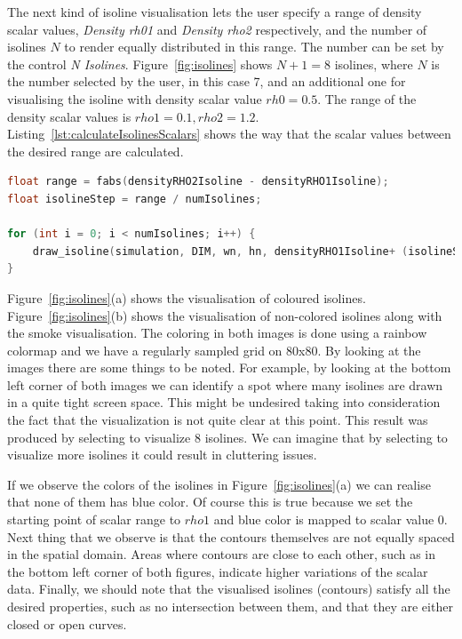 The next kind of isoline visualisation lets the user specify a range of density scalar values, \emph{Density rh01} and \emph{Density rho2} respectively, and the number of isolines $N$ to render equally distributed in this range. The number can be set by the control \emph{N Isolines}. Figure~\ref{fig:isolines} shows $N + 1 = 8$ isolines, where $N$ is the number selected by the user, in this case 7, and an additional one for visualising the isoline with density scalar value $rh0 = 0.5$. The range of the density scalar values is $rho1 = 0.1, rho2 = 1.2$. Listing~\ref{lst:calculateIsolinesScalars} shows the way that the scalar values between the desired range are calculated.

\begin{lstlisting}[language=C++,label=lst:calculateIsolinesScalars,caption={Calculate scalar between range values and draw isolines.}]
float range = fabs(densityRHO2Isoline - densityRHO1Isoline);
float isolineStep = range / numIsolines;

for (int i = 0; i < numIsolines; i++) {
	draw_isoline(simulation, DIM, wn, hn, densityRHO1Isoline+ (isolineStep * (i + 1)));
}
\end{lstlisting}
 
Figure~\ref{fig:isolines}(a) shows the visualisation of coloured isolines. Figure~\ref{fig:isolines}(b) shows the visualisation of non-colored isolines along with the smoke visualisation. The coloring in both images is done using a rainbow colormap and we have a regularly sampled grid on 80x80. By looking at the images there are some things to be noted. For example, by looking at the bottom left corner of both images we can identify a spot where many isolines are drawn in a quite tight screen space. This might be undesired taking into consideration the fact that the visualization is not quite clear at this point. This result was produced by selecting to visualize 8 isolines. We can imagine that by selecting to visualize more isolines it could result in cluttering issues.

If we observe the colors of the isolines in Figure~\ref{fig:isolines}(a) we can realise that none of them has blue color. Of course this is true because we set the starting point of scalar range to $rho1$ and blue color is mapped to scalar value 0. Next thing that we observe is that the contours themselves are not equally spaced in the spatial domain. Areas where contours are close to each other, such as in the bottom left corner of both figures, indicate higher variations of the scalar data. Finally, we should note that the visualised isolines (contours) satisfy all the desired properties, such as no intersection between them, and that they are either closed or open curves.

